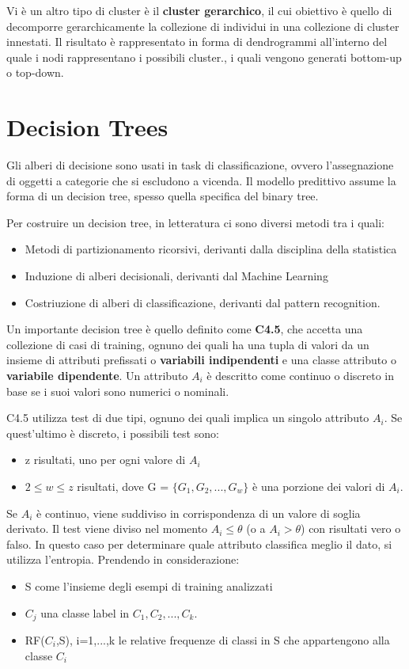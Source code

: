 \documentclass[a4paper]{extarticle}
\begin{document}
Vi è un altro tipo di cluster è il \textbf{cluster gerarchico}, il cui obiettivo è quello di decomporre gerarchicamente la collezione di individui in una collezione di cluster innestati. Il risultato è rappresentato in forma di dendrogrammi all'interno del quale i nodi rappresentano i possibili cluster., i quali vengono generati bottom-up o top-down.

\newpage

\section{Decision Trees}

Gli alberi di decisione sono usati in task di classificazione, ovvero l'assegnazione di oggetti a categorie che si escludono a vicenda. Il modello predittivo assume la forma di un decision tree, spesso quella specifica del binary tree.

Per costruire un decision tree, in letteratura ci sono diversi metodi tra i quali:
\begin{itemize}
\item Metodi di partizionamento ricorsivi, derivanti dalla disciplina della statistica
\item Induzione di alberi decisionali, derivanti dal Machine Learning
\item Costriuzione di alberi di classificazione, derivanti dal pattern recognition.
\end{itemize}

Un importante decision tree è quello definito come \textbf{C4.5}, che accetta una collezione di casi di training, ognuno dei quali ha una tupla di valori da un insieme di attributi prefissati o \textbf{variabili indipendenti} e una classe attributo o \textbf{variabile dipendente}. Un attributo $A_i$ è descritto come continuo o discreto in base se i suoi valori sono numerici o nominali.

C4.5 utilizza test di due tipi, ognuno dei quali implica un singolo attributo $A_i$. Se quest'ultimo è discreto, i possibili test sono:

\begin{itemize}
\item z risultati, uno per ogni valore di $A_i$
\item $2 \leq w \leq z$ risultati, dove G = $\{ G_1,G_2,...,G_w\}$ è una porzione dei valori di $A_i$.
\end{itemize}

Se $A_i$ è continuo, viene suddiviso in corrispondenza di un valore di soglia derivato. Il test viene diviso nel momento $A_i \leq \theta$ (o a $A_i > \theta$) con risultati vero o falso. In questo caso per determinare quale attributo classifica meglio il dato, si utilizza l'entropia. Prendendo in considerazione:
\begin{itemize}
\item S come l'insieme degli esempi di training analizzati
\item $C_j$ una classe label in $C_1,C_2,...,C_k$.
\item RF($C_i$,S), i=1,...,k le relative frequenze di classi in S che appartengono alla classe $C_i$
\end{itemize}
\end{document}
